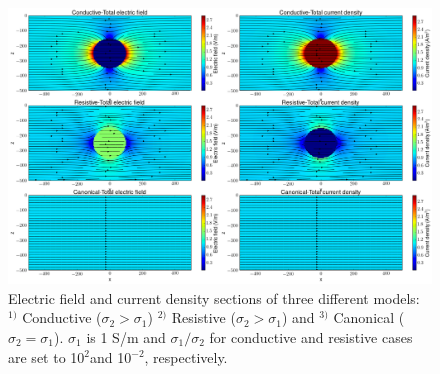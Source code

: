 \documentclass[a4paper, 11pt]{article}
\begin{document}
\begin{figure}[htb]
  \centering
  \includegraphics[width=1.0\textwidth]{DCEJFund.png}
  \caption{Electric field and current density sections of three different models: $^{1)}$ Conductive ($\sigma_2 > \sigma_1$) $^{2)}$ Resistive ($\sigma_2 > \sigma_1$) and $^{3)}$ Canonical ($\sigma_2 = \sigma_1$). $\sigma_1$ is 1 S/m and $\sigma_1 / \sigma_2$ for conductive and resistive cases are set to 10$^{2}$and 10$^{-2}$, respectively. }
  \label{fig:DCEJFund}
\end{figure}
\end{document}
